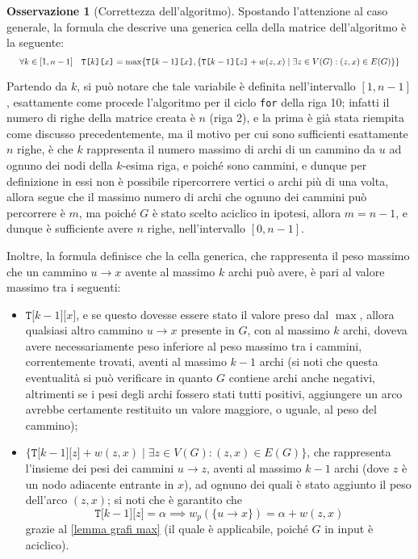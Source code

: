 \documentclass[14pt]{extreport}
\theoremstyle{definition}
\theoremstyle{definition}
\newtheorem{remark}{Osservazione}[subsection]
\begin{document}
\begin{remark}[Correttezza dell'algoritmo]
    Spostando l'attenzione al caso generale, la formula che descrive una generica cella della matrice dell'algoritmo è la seguente:
    \begin{equation*}
        \resizebox{.99\hsize}{!}{
            $\forall k \in [1, n-1] \quad \texttt{T[}k\texttt{][}x\texttt{]} = \max\{ \texttt{T[}k -1\texttt{][}x\texttt{]},\{\texttt{T[}k-1\texttt{][}z\texttt{]} + w(z, x) \mid \exists z \in V(G) : (z, x) \in E(G) \}\}$
        }
    \end{equation*}

    Partendo da $k$, si può notare che tale variabile è definita nell'intervallo $[1, n - 1]$, esattamente come procede l'algoritmo per il ciclo \texttt{for} della riga 10; infatti il numero di righe della matrice creata è $n$ (riga 2), e la prima è già stata riempita come discusso precedentemente, ma il motivo per cui sono sufficienti esattamente $n$ righe, è che $k$ rappresenta il numero massimo di archi di un cammino da $u$ ad ognuno dei nodi della $k$-esima riga, e poiché sono cammini, e dunque per definizione in essi non è possibile ripercorrere vertici o archi più di una volta, allora segue che il massimo numero di archi che ognuno dei cammini può percorrere è $m$, ma poiché $G$ è stato scelto aciclico in ipotesi, allora $m = n - 1$, e dunque è sufficiente avere $n$ righe, nell'intervallo $[0, n - 1]$.

    Inoltre, la formula definisce che la cella generica, che rappresenta il peso massimo che un cammino $u \rightarrow x$ avente al massimo $k$ archi può avere, è pari al valore massimo tra i seguenti:

    \begin{itemize}
        \item $\texttt{T[}k - 1\texttt{][}x\texttt{]}$, e se questo dovesse essere stato il valore preso dal $\max$, allora qualsiasi altro cammino $u \rightarrow x$ presente in $G$, con al massimo $k$ archi, doveva avere necessariamente peso inferiore al peso massimo tra i cammini, correntemente trovati, aventi al massimo $k - 1$ archi (si noti che questa eventualità si può verificare in quanto $G$ contiene archi anche negativi, altrimenti se i pesi degli archi fossero stati tutti positivi, aggiungere un arco avrebbe certamente restituito un valore maggiore, o uguale, al peso del cammino);
        \item $\{\texttt{T[}k-1\texttt{][}z\texttt{]} + w(z, x) \mid \exists z \in V(G) : (z, x) \in E(G) \}$, che rappresenta l'insieme dei pesi dei cammini $u \rightarrow z$, aventi al massimo $k - 1$ archi (dove $z$ è un nodo adiacente entrante in $x$), ad ognuno dei quali è stato aggiunto il peso dell'arco $(z, x)$; si noti che è garantito che $$\texttt{T[}k - 1\texttt{][}z\texttt{]} = \alpha \implies w_p(\{u \rightarrow x\}) = \alpha + w(z, x)$$ grazie al \cref{lemma grafi max} (il quale è applicabile, poiché $G$ in input è aciclico).
    \end{itemize}


\end{remark}
\end{document}
